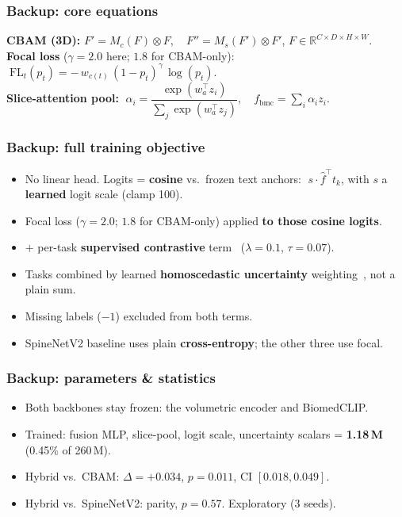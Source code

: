 \documentclass[12pt]{beamer}
\begin{document}
\begin{frame}
\frametitle{Backup: core equations}
\textbf{CBAM (3D):}\;
$F' = M_c(F)\otimes F,\quad F'' = M_s(F')\otimes F'$,\;
$F\in\mathbb{R}^{C\times D\times H\times W}$.\\[6pt]
\textbf{Focal loss} ($\gamma{=}2.0$ here; $1.8$ for CBAM-only):
$\;\mathrm{FL}_t(p_t) = -\,w_{c(t)}\,(1-p_t)^{\gamma}\,\log(p_t).$\\[6pt]
\textbf{Slice-attention pool:}
$\;\alpha_i = \dfrac{\exp(w_a^\top z_i)}{\sum_j \exp(w_a^\top z_j)},\quad
f_{\text{bmc}} = \sum_i \alpha_i z_i .$
\end{frame}

\begin{frame}
\frametitle{Backup: full training objective}
\begin{itemize}\small
    \item[--] No linear head. Logits = \textbf{cosine} vs.\ frozen text anchors:
      $\;s\cdot\hat f^\top t_k$, with $s$ a \textbf{learned} logit scale (clamp 100).
    \item[--] Focal loss ($\gamma{=}2.0$; $1.8$ for CBAM-only) applied \textbf{to those cosine logits}.
    \item[--] $+$ per-task \textbf{supervised contrastive} term~\cite{khosla2020supcon} ($\lambda{=}0.1$, $\tau{=}0.07$).
    \item[--] Tasks combined by learned \textbf{homoscedastic uncertainty} weighting~\cite{kendall2018multitask}, not a plain sum.
    \item[--] Missing labels ($-1$) excluded from both terms.
    \item[--] SpineNetV2 baseline uses plain \textbf{cross-entropy}; the other three use focal.
\end{itemize}
\end{frame}

\begin{frame}
\frametitle{Backup: parameters \& statistics}
\begin{itemize}\small
    \item[--] Both backbones stay frozen: the volumetric encoder and BiomedCLIP.
    \item[--] Trained: fusion MLP, slice-pool, logit scale, uncertainty scalars = \textbf{1.18\,M} (0.45\% of 260\,M).
    \item[--] Hybrid vs.\ CBAM: $\Delta{=}{+}0.034$, $p{=}0.011$, CI $[0.018,0.049]$.
    \item[--] Hybrid vs.\ SpineNetV2: parity, $p{=}0.57$. Exploratory (3 seeds).
\end{itemize}
\end{frame}
\end{document}
